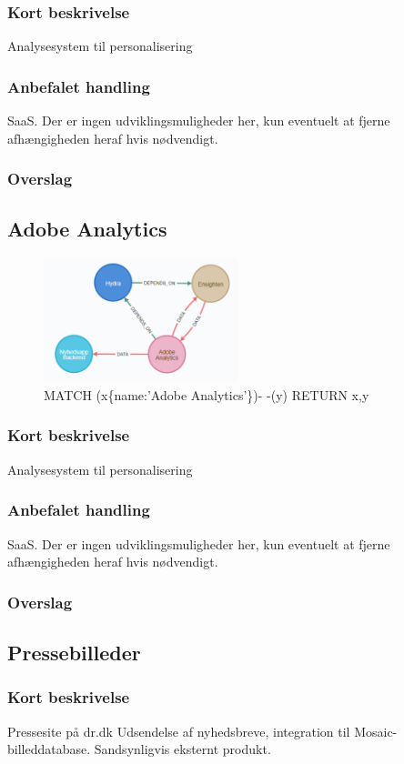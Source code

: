 \documentclass{article}
\begin{document}
\subsubsection{Kort beskrivelse}
Analysesystem til personalisering
\subsubsection{Anbefalet handling}
SaaS. Der er ingen udviklingsmuligheder her, kun eventuelt at fjerne afhængigheden heraf hvis nødvendigt.
\subsubsection{Overslag}


\subsection{Adobe Analytics}
\begin{figure}[h]
\includegraphics[width=160pt]{AdobeAnalytics.PNG}
\caption{MATCH (x\{name:'Adobe Analytics'\})- -(y) RETURN x,y}
\end{figure}
\subsubsection{Kort beskrivelse}
Analysesystem til personalisering
\subsubsection{Anbefalet handling}
SaaS. Der er ingen udviklingsmuligheder her, kun eventuelt at fjerne afhængigheden heraf hvis nødvendigt.
\subsubsection{Overslag}


\subsection{Pressebilleder}
\subsubsection{Kort beskrivelse}
Pressesite på dr.dk Udsendelse af nyhedsbreve, integration til Mosaic-billeddatabase. Sandsynligvis eksternt produkt.
\end{document}
